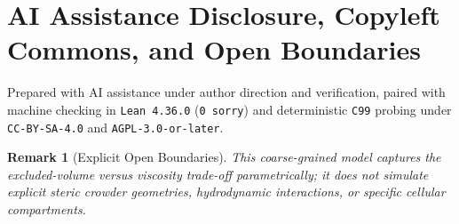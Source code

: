 \documentclass[11pt,a4paper]{article}
\newtheorem{remark}{Remark}
\begin{document}
\section*{AI Assistance Disclosure, Copyleft Commons, and Open Boundaries}
Prepared with AI assistance under author direction and verification, paired with machine checking in \texttt{Lean~4.36.0} (\texttt{0~sorry}) and deterministic \texttt{C99} probing under \texttt{CC-BY-SA-4.0} and \texttt{AGPL-3.0-or-later}.

\begin{remark}[Explicit Open Boundaries]
This coarse-grained model captures the excluded-volume versus viscosity trade-off parametrically; it does not simulate explicit steric crowder geometries, hydrodynamic interactions, or specific cellular compartments.
\end{remark}
\end{document}
